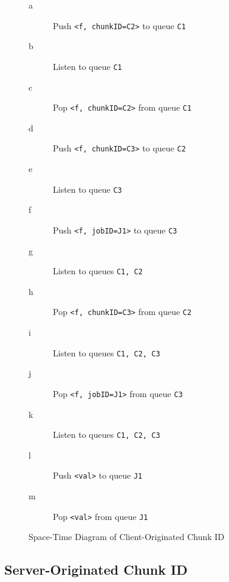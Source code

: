 \documentclass[a4paper,10pt]{article}
\begin{document}
\begin{figure}
\begin{minipage}{0.6\textwidth}
	\end{minipage}
	\begin{minipage}{0.4\textwidth}
		\begin{description}
			\item [\textcolor{dark2-1}{a}] Push \texttt{<f, chunkID=C2>} to queue \texttt{C1}
			\item [\textcolor{gray62}{b}] Listen to queue \texttt{C1}
			\item [\textcolor{dark2-1}{c}] Pop \texttt{<f, chunkID=C2>} from queue \texttt{C1}
			\item [\textcolor{dark2-3}{d}] Push \texttt{<f, chunkID=C3>} to queue \texttt{C2}
			\item [\textcolor{dark2-5}{e}] Listen to queue \texttt{C3}
			\item [\textcolor{dark2-5}{f}] Push \texttt{<f, jobID=J1>} to queue \texttt{C3}
			\item [\textcolor{gray62}{g}] Listen to queues \texttt{C1, C2}
			\item [\textcolor{dark2-3}{h}] Pop \texttt{<f, chunkID=C3>} from queue \texttt{C2}
			\item [\textcolor{gray62}{i}] Listen to queues \texttt{C1, C2, C3}
			\item [\textcolor{dark2-5}{j}] Pop \texttt{<f, jobID=J1>} from queue \texttt{C3}
			\item [\textcolor{gray62}{k}] Listen to queues \texttt{C1, C2, C3}
			\item [\textcolor{dark2-5}{l}] Push \texttt{<val>} to queue \texttt{J1}
			\item [\textcolor{dark2-5}{m}] Pop \texttt{<val>} from queue \texttt{J1}
		\end{description}
	\end{minipage}
	\caption{\label{fig:mci} Space-Time Diagram of Client-Originated Chunk ID}
\end{figure}

\subsection{Server-Originated Chunk ID}
\end{document}

